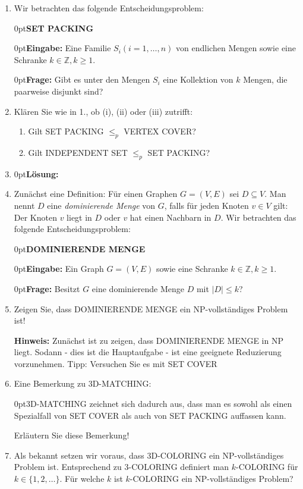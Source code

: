 \documentclass[12pt,a4paper]{scrreprt}
\newcommand{\prob}[1]{\vspace{.5\baselineskip}\begin{addmargin}[15pt]{0pt}\textbf{#1}\end{addmargin}}
\newcommand{\ein}[1]{\vspace{.5\baselineskip}\begin{addmargin}[15pt]{0pt}\textbf{Eingabe: }#1\end{addmargin}}
\newcommand{\fra}[1]{\vspace{.5\baselineskip}\begin{addmargin}[15pt]{0pt}\textbf{Frage: }#1\end{addmargin}}
\newcommand{\loesung}[1]{\vspace{.5\baselineskip}\begin{addmargin}[0pt]{0pt}\textbf{Lösung: }#1\end{addmargin}}
\newcommand{\pr}{$\leq_p$ }%
\begin{document}
\begin{enumerate}
{}

\item Wir betrachten das folgende Entscheidungsproblem:

\prob{SET PACKING}

\ein{Eine Familie $S_i (i = 1 , \ldots, n)$ von endlichen Mengen sowie eine Schranke $k \in \mathds{Z}, k\geq 1$.}

\fra{Gibt es unter den Mengen $S_i$ eine Kollektion von $k$ Mengen, die paarweise disjunkt sind?}

\item[] Klären Sie wie in 1., ob (i), (ii) oder (iii) zutrifft:

\begin{enumerate}
	\item Gilt SET PACKING \pr VERTEX COVER?
	\item Gilt INDEPENDENT SET \pr SET PACKING?
\end{enumerate}

\item[]\loesung{}

\item Zunächst eine Definition: Für einen Graphen $G = (V,E)$ sei $D \subseteq V$. Man nennt $D$ eine \emph{dominierende Menge} von $G$, falls für jeden Knoten $v \in V$ gilt: Der Knoten $v$ liegt in $D$ oder $v$ hat einen Nachbarn in $D$. Wir betrachten das folgende Entscheidungsproblem:

\prob{DOMINIERENDE MENGE}

\ein{Ein Graph $G = (V, E)$ sowie eine Schranke $k \in \mathds{Z}, k \geq 1$.}

\fra{Besitzt $G$ eine dominierende Menge $D$ mit $|D| \leq k$?}

\item[] Zeigen Sie, dass DOMINIERENDE MENGE ein NP-vollständiges Problem ist!

\textbf{Hinweis:} Zunächst ist zu zeigen, dass DOMINIERENDE MENGE in NP liegt. Sodann - dies ist die Hauptaufgabe - ist eine geeignete Reduzierung vorzunehmen. Tipp: Versuchen Sie es mit SET COVER

\item Eine Bemerkung zu 3D-MATCHING:

\begin{addmargin}[30pt]{0pt}3D-MATCHING zeichnet sich dadurch aus, dass man es sowohl als einen Spezialfall von SET COVER als auch von SET PACKING auffassen kann.\end{addmargin}

Erläutern Sie diese Bemerkung!

\item Als bekannt setzen wir voraus, dass 3D-COLORING ein NP-vollständiges Problem ist. Entsprechend zu 3-COLORING definiert man $k$-COLORING für $k \in \{1,2,\ldots\}.$ Für welche $k$ ist $k$-COLORING ein NP-vollständiges Problem?
 


\end{enumerate}
\end{document}
